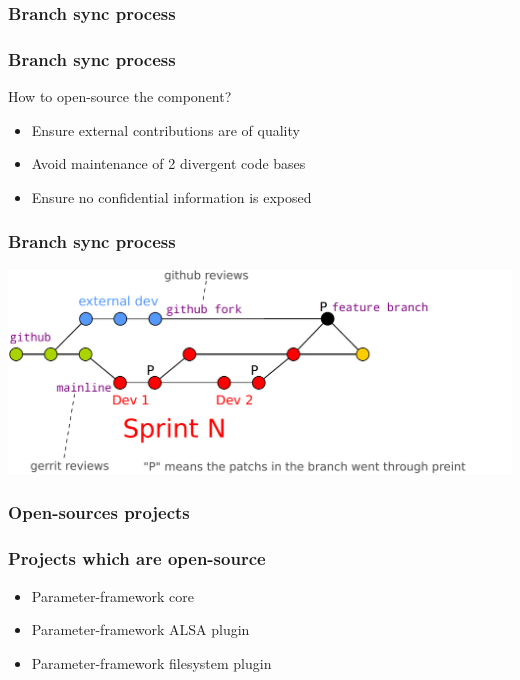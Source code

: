 \subsubsection{Branch sync process}
\begin{frame}
    \frametitle{Branch sync process}
    \begin{block}{How to open-source the component?}
        \begin{itemize}
            \item Ensure external contributions are of quality
            \item Avoid maintenance of 2 divergent code bases
            \item Ensure no confidential information is exposed
        \end{itemize}
    \end{block}
\end{frame}

\begin{frame}
    \frametitle{Branch sync process}
    \centering
    \includegraphics[width=\textwidth]{../../report/src/img/branches-process.pdf}
\end{frame}

\subsubsection{Open-sources projects}
\begin{frame}
    \frametitle{Projects which are open-source}
    \begin{itemize}
        \item Parameter-framework core
        \item Parameter-framework ALSA plugin
        \item Parameter-framework filesystem plugin
    \end{itemize}
\end{frame}
